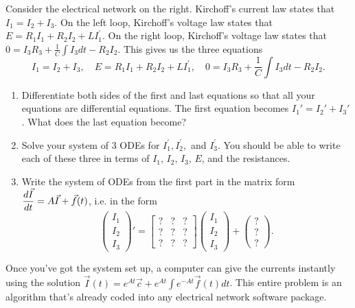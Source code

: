 \begin{problem}
\marginpar{}%
Consider the electrical network on the right.  
Kirchoff's current law states that $I_1=I_2+I_3$.  On the left loop, Kirchoff's voltage law states that $E = R_1I_1+R_2I_2+LI_1^\prime$.  On the right loop, Kirchoff's voltage law states that $0=I_3R_3 +\frac{1}{C}\int I_3 dt - R_2I_2$. This gives us the three equations
$$
I_1=I_2+I_3,\quad
E = R_1I_1+R_2I_2+LI_1^\prime,\quad
0=I_3R_3 +\frac{1}{C}\int I_3 dt - R_2I_2.$$

\begin{enumerate}
\item 
 Differentiate both sides of the first and last equations so that all your equations are differential equations.  The first equation becomes $I_1'=I_2'+I_3'$. What does the last equation become?
\item 
 Solve your system of 3 ODEs for $I_1^\prime, I_2^\prime,$ and $I_3^\prime$. You should be able to write each of these three in terms  of $I_1$, $I_2$, $I_3$,  $E$, and the resistances. 
\item Write the system of ODEs from the first part in the matrix form $\displaystyle \frac{d\vec I}{dt} 
= A\vec I +\vec f(t)$, i.e. in the form 
$$
\begin{pmatrix}
 I_1\\I_2\\I_3
\end{pmatrix}'
=
\begin{bmatrix}
 ?&?&?\\
 ?&?&?\\
 ?&?&?
\end{bmatrix}
\begin{pmatrix}
 I_1\\I_2\\I_3
\end{pmatrix}
+
\begin{pmatrix}
 ?\\?\\?
\end{pmatrix}
.$$
\end{enumerate}
Once you've got the system set up, a computer can give the currents instantly using the solution $\vec I(t) = e^{At}\vec c + e^{At}\int e^{-At} \vec f(t) dt$. This entire problem is an algorithm that's already coded into any electrical network software package.
\end{problem}




